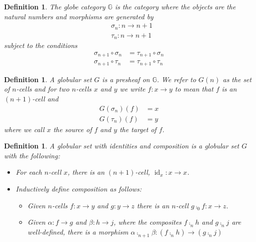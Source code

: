 \documentclass{article}
\newtheorem{definition}[theorem]{Definition} \theoremstyle{remark}
\DeclareMathOperator{\id}{id}
\begin{document}
\begin{definition}
  The \emph{globe category} \(\mathbb{G}\) is the category where the
  objects are the natural numbers and morphisms are generated by
  \begin{align*}
    &\sigma_n : n \to n+1\\
    &\tau_n : n \to n+1
  \end{align*}
  subject to the conditions
  \begin{align*}
    \sigma_{n + 1} \circ \sigma_n &= \tau_{n + 1} \circ \sigma_n\\
    \sigma_{n + 1} \circ \tau_n &= \tau_{n + 1} \circ \tau_n
  \end{align*}
\end{definition}

\begin{definition}
  A \emph{globular set} \(G\) is a presheaf on \(\mathbb{G}\). We
  refer to \(G(n)\) as the set of \(n\)-cells and for two \(n\)-cells
  \(x\) and \(y\) we write \(f: x \to y\) to mean that \(f\) is an
  \((n+1)\)-cell and
  \begin{align*}
    G(\sigma_n)(f) &= x\\
    G(\tau_n)(f) &= y
  \end{align*}
  where we call \(x\) the source of \(f\) and \(y\) the target of
  \(f\).
\end{definition}

\begin{definition}
  A \emph{globular set with identities and composition} is a globular
  set \(G\) with the following:
  \begin{itemize}
  \item For each \(n\)-cell \(x\), there is an \((n+1)\)-cell, \(\id_x
    : x \to x\).
  \item Inductively define composition as follows:
    \begin{itemize}
    \item Given \(n\)-cells \(f: x \to y\) and \(g: y \to z\) there is
      an \(n\)-cell \(g \comp_0 f: x \to z\).
    \item Given \(\alpha: f \to g\) and \(\beta: h \to j\), where the
      composites \(f \comp_n h\) and \(g \comp_n j\) are well-defined,
      there is a morphism \(\alpha \comp_{n+1} \beta: (f \comp_n h)
      \to (g \comp_n j)\)
    \end{itemize}
  \end{itemize}
\end{definition}
\end{document}
